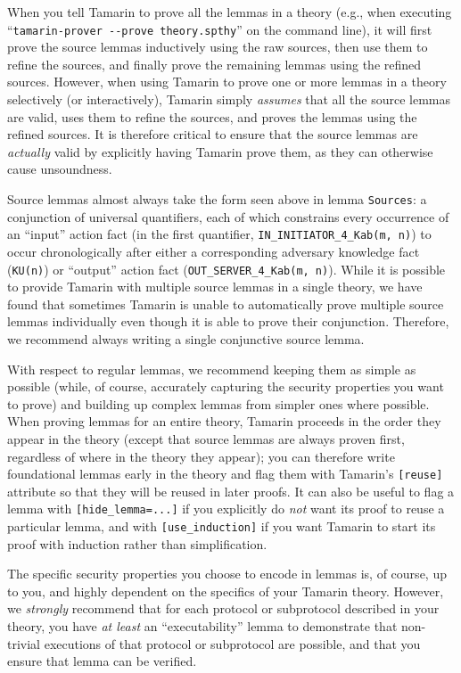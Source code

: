 When you tell Tamarin to prove all the lemmas in a theory (e.g., when executing ``\texttt{tamarin-prover -{}-prove theory.spthy}'' on the command line), it will first prove the source lemmas inductively using the raw sources, then use them to refine the sources, and finally prove the remaining lemmas using the refined sources. However, when using Tamarin to prove one or more lemmas in a theory selectively (or interactively), Tamarin simply \emph{assumes} that all the source lemmas are valid, uses them to refine the sources, and proves the lemmas using the refined sources. It is therefore critical to ensure that the source lemmas are \emph{actually} valid by explicitly having Tamarin prove them, as they can otherwise cause unsoundness.

Source lemmas almost always take the form seen above in lemma \lstinline{Sources}: a conjunction of universal quantifiers, each of which constrains every occurrence of an ``input'' action fact (in the first quantifier, \lstinline{IN_INITIATOR_4_Kab(m, n)}) to occur chronologically after either a corresponding adversary knowledge fact (\lstinline{KU(n)}) or ``output'' action fact (\lstinline{OUT_SERVER_4_Kab(m, n)}). While it is possible to provide Tamarin with multiple source lemmas in a single theory, we have found that sometimes Tamarin is unable to automatically prove multiple source lemmas individually even though it is able to prove their conjunction. Therefore, we recommend always writing a single conjunctive source lemma.

With respect to regular lemmas, we recommend keeping them as simple as possible (while, of course, accurately capturing the security properties you want to prove) and building up complex lemmas from simpler ones where possible. When proving lemmas for an entire theory, Tamarin proceeds in the order they appear in the theory (except that source lemmas are always proven first, regardless of where in the theory they appear); you can therefore write foundational lemmas early in the theory and flag them with Tamarin's \lstinline{[reuse]} attribute so that they will be reused in later proofs. It can also be useful to flag a lemma with \lstinline{[hide_lemma=...]} if you explicitly do \emph{not} want its proof to reuse a particular lemma, and with \lstinline{[use_induction]} if you want Tamarin to start its proof with induction rather than simplification.

The specific security properties you choose to encode in lemmas is, of course, up to you, and highly dependent on the specifics of your Tamarin theory. However, we \emph{strongly} recommend that for each protocol or subprotocol described in your theory, you have \emph{at least} an ``executability'' lemma to demonstrate that non-trivial executions of that protocol or subprotocol are possible, and that you ensure that lemma can be verified.


